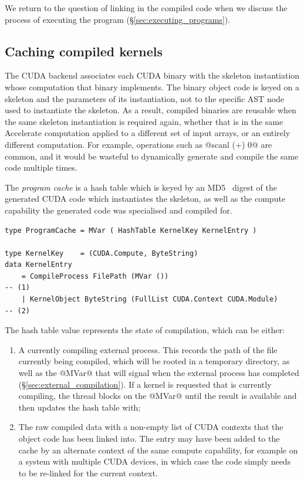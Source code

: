 We return to the question of linking in the compiled code when we discuss the
process of executing the program (\S\ref{sec:executing_programs}).


\subsection{Caching compiled kernels}
\label{sec:caching_compiled_kernels}


The CUDA backend associates each CUDA binary with the skeleton instantiation
whose computation that binary implements. The binary object code is keyed on a
skeleton and the parameters of its instantiation, not to the specific AST node
used to instantiate the skeleton. As a result, compiled binaries are reusable
when the same skeleton instantiation is required again, whether that is in the
same Accelerate computation applied to a different set of input arrays, or an
entirely different computation. For example, operations such as @scanl (+) 0@
are common, and it would be wasteful to dynamically generate and compile the
same code multiple times.

The \emph{program cache} is a hash table which is keyed by an
MD5~\cite{Rivest:1992va} digest of the generated CUDA code which instantiates
the skeleton, as well as the compute capability the generated code was
specialised and compiled for.
%
\begin{lstlisting}[style=haskell,numbers=none]
type ProgramCache = MVar ( HashTable KernelKey KernelEntry )

type KernelKey    = (CUDA.Compute, ByteString)
data KernelEntry
    = CompileProcess FilePath (MVar ())                                            -- (1)
    | KernelObject ByteString (FullList CUDA.Context CUDA.Module)                  -- (2)
\end{lstlisting}
%
The hash table value represents the state of compilation, which can be either:
%
\begin{enumerate}
\item A currently compiling external process. This records the path of the file
    currently being compiled, which will be rooted in a temporary directory, as
    well as the @MVar@ that will signal when the external process has
    completed (\S\ref{sec:external_compilation}). If a kernel is requested that
    is currently compiling, the thread blocks on the @MVar@ until the
    result is available and then updates the hash table with;

\item The raw compiled data with a non-empty list of CUDA contexts that the
    object code has been linked into. The entry may have been added to the cache
    by an alternate context of the same compute capability, for example on a
    system with multiple CUDA devices, in which case the code simply needs to be
    re-linked for the current context.
\end{enumerate}

